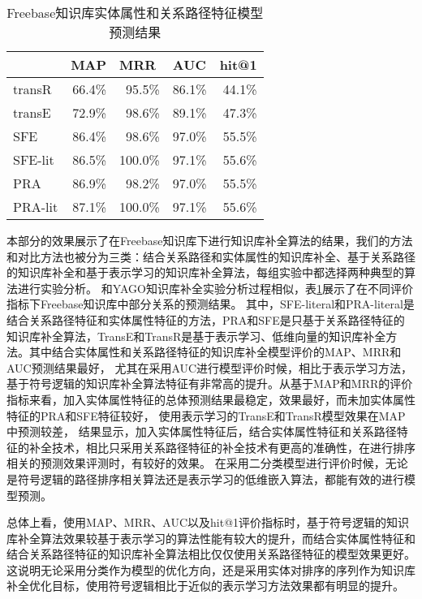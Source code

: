 \begin{table}[htbp]
  \centering
  \caption{Freebase知识库实体属性和关系路径特征模型预测结果}
    \begin{tabular}{|l|r|r|r|r|}
    \hline
          & \multicolumn{1}{l|}{MAP} & \multicolumn{1}{l|}{MRR} & \multicolumn{1}{l|}{AUC} & \multicolumn{1}{l|}{hit@1} \\
    \hline
    transR & 66.4\% & 95.5\% & 86.1\% & 44.1\% \\
    \hline
    transE & 72.9\% & 98.6\% & 89.1\% & 47.3\% \\
    \hline
    SFE   & 86.4\% & 98.6\% & 97.0\% & 55.5\% \\
    \hline
    SFE-lit & 86.5\% & 100.0\% & 97.1\% & 55.6\% \\
    \hline
    PRA   & 86.9\% & 98.2\% & 97.0\% & 55.5\% \\
    \hline
    PRA-lit & 87.1\% & 100.0\% & 97.1\% & 55.6\% \\
    \hline
    \end{tabular}%
  \label{tab:addlabel-fb}%
\end{table}%
本部分的效果展示了在Freebase知识库下进行知识库补全算法的结果，我们的方法和对比方法也被分为三类：结合关系路径和实体属性的知识库补全、基于关系路径的知识库补全和基于表示学习的知识库补全算法，每组实验中都选择两种典型的算法进行实验分析。
和YAGO知识库补全实验分析过程相似，表\ref{tab:addlabel-fb}展示了在不同评价指标下Freebase知识库中部分关系的预测结果。
其中，SFE-literal和PRA-literal是结合关系路径特征和实体属性特征的方法，PRA和SFE是只基于关系路径特征的知识库补全算法，TransE和TransR是基于表示学习、低维向量的知识库补全方法。其中结合实体属性和关系路径特征的知识库补全模型评价的MAP、MRR和AUC预测结果最好，
尤其在采用AUC进行模型评价时候，相比于表示学习方法，基于符号逻辑的知识库补全算法特征有非常高的提升。从基于MAP和MRR的评价指标来看，加入实体属性特征的总体预测结果最稳定，效果最好，而未加实体属性特征的PRA和SFE特征较好，
使用表示学习的TransE和TransR模型效果在MAP中预测较差，
结果显示，加入实体属性特征后，结合实体属性特征和关系路径特征的补全技术，相比只采用关系路径特征的补全技术有更高的准确性，在进行排序相关的预测效果评测时，有较好的效果。
在采用二分类模型进行评价时候，无论是符号逻辑的路径排序相关算法还是表示学习的低维嵌入算法，都能有效的进行模型预测。

总体上看，使用MAP、MRR、AUC以及hit@1评价指标时，基于符号逻辑的知识库补全算法效果较基于表示学习的算法性能有较大的提升，而结合实体属性特征和结合关系路径特征的知识库补全算法相比仅仅使用关系路径特征的模型效果更好。这说明无论采用分类作为模型的优化方向，还是采用实体对排序的序列作为知识库补全优化目标，使用符号逻辑相比于近似的表示学习方法效果都有明显的提升。


